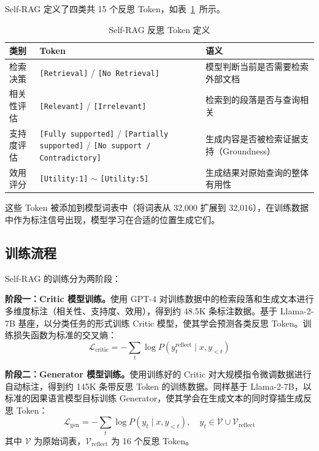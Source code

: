 \documentclass[11pt,a4paper]{article}
\begin{document}
Self-RAG 定义了四类共 15 个反思 Token，如表~\ref{tab:tokens}~所示。

\begin{table}[H]
\centering
\caption{Self-RAG 反思 Token 定义}
\label{tab:tokens}
\begin{tabular}{p{2.5cm}p{4cm}p{6cm}}
\toprule
类别 & Token & 语义 \\
\midrule
检索决策 & \texttt{[Retrieval]} / \texttt{[No Retrieval]} & 模型判断当前是否需要检索外部文档 \\
\midrule
相关性评估 & \texttt{[Relevant]} / \texttt{[Irrelevant]} & 检索到的段落是否与查询相关 \\
\midrule
支持度评估 & \texttt{[Fully supported]} / \texttt{[Partially supported]} / \texttt{[No support / Contradictory]} & 生成内容是否被检索证据支持（Groundness） \\
\midrule
效用评分 & \texttt{[Utility:1]} $\sim$ \texttt{[Utility:5]} & 生成结果对原始查询的整体有用性 \\
\bottomrule
\end{tabular}
\end{table}

这些 Token 被添加到模型词表中（将词表从 32,000 扩展到 32,016），在训练数据中作为标注信号出现，模型学习在合适的位置生成它们。

\subsection{训练流程}
\label{sec:training_pipeline}

Self-RAG 的训练分为两阶段：

\textbf{阶段一：Critic 模型训练。}使用 GPT-4 对训练数据中的检索段落和生成文本进行多维度标注（相关性、支持度、效用），得到约 48.5K 条标注数据。基于 Llama-2-7B 基座，以分类任务的形式训练 Critic 模型，使其学会预测各类反思 Token。训练损失函数为标准的交叉熵：
\begin{equation}
\mathcal{L}_{\text{critic}} = -\sum_{t} \log P(y_t^{\text{reflect}} \mid x, y_{<t})
\end{equation}

\textbf{阶段二：Generator 模型训练。}使用训练好的 Critic 对大规模指令微调数据进行自动标注，得到约 145K 条带反思 Token 的训练数据。同样基于 Llama-2-7B，以标准的因果语言模型目标训练 Generator，使其学会在生成文本的同时穿插生成反思 Token：
\begin{equation}
\mathcal{L}_{\text{gen}} = -\sum_{t} \log P(y_t \mid x, y_{<t}), \quad y_t \in \mathcal{V} \cup \mathcal{V}_{\text{reflect}}
\end{equation}
其中 $\mathcal{V}$ 为原始词表，$\mathcal{V}_{\text{reflect}}$ 为 16 个反思 Token。
\end{document}
